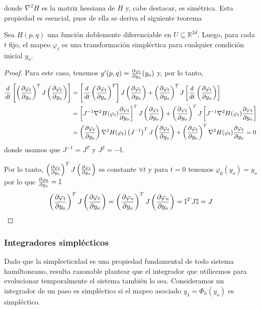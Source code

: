 donde $\nabla^2 H$ es la matriz hessiana de $H$ y, cabe destacar, es simétrica. Esta propiedad es esencial, pues de ella se deriva el siguiente teorema

\begin{theorem}{\label{teo:preservacion_evol}}
  Sea $H(p,q)$ una función doblemente diferenciable en $U\subseteq\mathbb{R}^{2d}$. Luego, para cada $t$ fijo, el mapeo $\varphi_t$ es una transformación simpléctica
  para cualquier condición inicial $y_o$.
\end{theorem}
\begin{proof}
 Para este caso, tenemos $g'(p,q) = \frac{\partial\varphi_t}{\partial y_o}(y_o)$ y, por lo tanto,
 \begin{align*}
  \frac{d}{dt}\left[ \left(\frac{\partial\varphi_t}{\partial y_o}\right)^T J \left(\frac{\partial\varphi_t}{\partial y_o}\right) \right]
  &= \left[\frac{d}{dt}\left(\frac{\partial\varphi_t}{\partial y_o}\right)^T\right] J \left(\frac{\partial\varphi_t}{\partial y_o}\right) + \left(\frac{\partial\varphi_t}{\partial y_o}\right)^T J \left[\frac{d}{dt}\left(\frac{\partial\varphi_t}{\partial y_o}\right)\right] \\
  &= \left[J^{-1} \nabla^2 H(\varphi_t)\frac{\partial\varphi_t}{\partial y_o}\right]^T J \left(\frac{\partial\varphi_t}{\partial y_o}\right) + \left(\frac{\partial\varphi_t}{\partial y_o}\right)^T J \left[J^{-1} \nabla^2 H(\varphi_t)\frac{\partial\varphi_t}{\partial y_o}\right] \\
  &= \left(\frac{\partial\varphi_t}{\partial y_o}\right)\nabla^2 H(\varphi_t)\left(J^{-1} \right)^T J \left(\frac{\partial\varphi_t}{\partial y_o}\right) + \left(\frac{\partial\varphi_t}{\partial y_o}\right)^T \nabla^2 H(\varphi_t)\frac{\partial\varphi_t}{\partial y_o} = 0
 \end{align*}
 donde usamos que $J^{-1} = J^T$ y $J^2 = -\mathbb{I}$.

 Por lo tanto, $\left(\frac{\partial\varphi_t}{\partial y_o}\right)^T J \left(\frac{\partial\varphi_t}{\partial y_o}\right)$ es constante $\forall t$ y para $t=0$ tenemos $\varphi_0(y_o) = y_o$ por lo que $\frac{\partial\varphi_0}{\partial y_o}=\mathbb{I}$
 \[ \left(\frac{\partial\varphi_t}{\partial y_o}\right)^T J \left(\frac{\partial\varphi_t}{\partial y_o}\right) = \left(\frac{\partial\varphi_o}{\partial y_o}\right)^T J \left(\frac{\partial\varphi_o}{\partial y_o}\right) = \mathbb{I}^T J \mathbb{I} = J\]
\end{proof}


\subsubsection{Integradores simplécticos}{\label{sec:int_simpl}}

Dado que la simplecticidad es una propiedad fundamental de todo sistema hamiltoneano, resulta razonable plantear que el integrador que utilicemos para evolucionar temporalmente
el sistema también lo sea.
Consideramos un integrador de un paso es simpléctico si el mapeo asociado $y_1=\Phi_h(y_o)$ es simpléctico.

